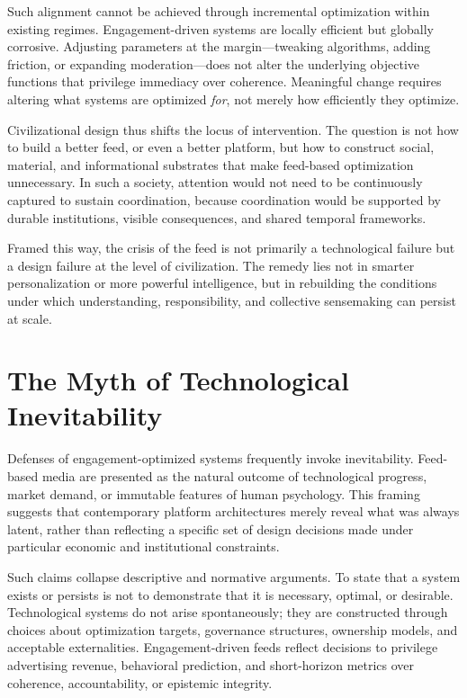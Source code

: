 \documentclass[12pt]{article}
\begin{document}
Such alignment cannot be achieved through incremental optimization within existing regimes. Engagement-driven systems are locally efficient but globally corrosive. Adjusting parameters at the margin—tweaking algorithms, adding friction, or expanding moderation—does not alter the underlying objective functions that privilege immediacy over coherence. Meaningful change requires altering what systems are optimized \emph{for}, not merely how efficiently they optimize.

Civilizational design thus shifts the locus of intervention. The question is not how to build a better feed, or even a better platform, but how to construct social, material, and informational substrates that make feed-based optimization unnecessary. In such a society, attention would not need to be continuously captured to sustain coordination, because coordination would be supported by durable institutions, visible consequences, and shared temporal frameworks.

Framed this way, the crisis of the feed is not primarily a technological failure but a design failure at the level of civilization. The remedy lies not in smarter personalization or more powerful intelligence, but in rebuilding the conditions under which understanding, responsibility, and collective sensemaking can persist at scale.

\section{The Myth of Technological Inevitability}

Defenses of engagement-optimized systems frequently invoke inevitability. Feed-based media are presented as the natural outcome of technological progress, market demand, or immutable features of human psychology. This framing suggests that contemporary platform architectures merely reveal what was always latent, rather than reflecting a specific set of design decisions made under particular economic and institutional constraints.

Such claims collapse descriptive and normative arguments. To state that a system exists or persists is not to demonstrate that it is necessary, optimal, or desirable. Technological systems do not arise spontaneously; they are constructed through choices about optimization targets, governance structures, ownership models, and acceptable externalities. Engagement-driven feeds reflect decisions to privilege advertising revenue, behavioral prediction, and short-horizon metrics over coherence, accountability, or epistemic integrity.
\end{document}
